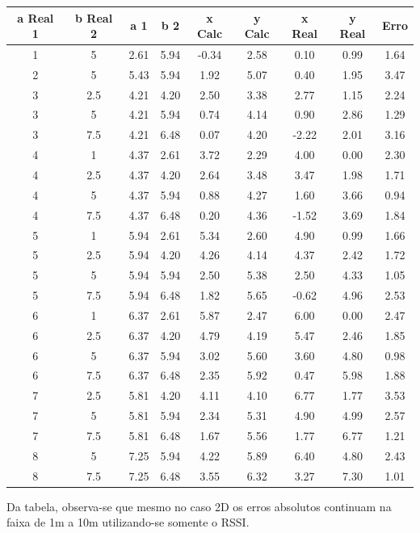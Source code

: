 \begin{center}
    \begin{tabular}{||c c c c c c c c c||} 
    \hline
    a Real 1 & b Real 2 & a 1 & b 2 & x Calc & y Calc	& x Real & y Real & Erro\\ [0.5ex] 
    \hline\hline
    1 & 5 & 2.61 & 5.94 & -0.34 & 2.58 & 0.10 & 0.99 & 1.64\\ 
    \hline
    2 & 5 & 5.43 & 5.94 & 1.92 & 5.07 & 0.40 & 1.95 & 3.47\\ 
    \hline
    3 & 2.5 & 4.21 & 4.20 & 2.50 & 3.38 & 2.77 & 1.15 & 2.24\\ 
    \hline
    3 & 5 & 4.21 & 5.94 & 0.74 & 4.14 & 0.90 & 2.86 & 1.29\\ 
    \hline
    3 & 7.5 & 4.21 & 6.48 & 0.07 & 4.20 & -2.22 & 2.01 & 3.16\\ 
    \hline
    4 & 1 & 4.37 & 2.61 & 3.72 & 2.29 & 4.00 & 0.00 & 2.30\\ 
    \hline
    4 & 2.5 & 4.37 & 4.20 & 2.64 & 3.48 & 3.47 & 1.98 & 1.71\\ 
    \hline
    4 & 5 & 4.37 & 5.94 & 0.88 & 4.27 & 1.60 & 3.66 & 0.94\\ 
    \hline
    4 & 7.5 & 4.37 & 6.48 & 0.20 & 4.36 & -1.52 & 3.69 & 1.84\\ 
    \hline
    5 & 1 & 5.94 & 2.61 & 5.34 & 2.60 & 4.90 & 0.99 & 1.66\\ 
    \hline
    5 & 2.5 & 5.94 & 4.20 & 4.26 & 4.14 & 4.37 & 2.42 & 1.72\\ 
    \hline
    5 & 5 & 5.94 & 5.94 & 2.50 & 5.38 & 2.50 & 4.33 & 1.05\\ 
    \hline
    5 & 7.5 & 5.94 & 6.48 & 1.82 & 5.65 & -0.62 & 4.96 & 2.53\\ 
    \hline
    6 & 1 & 6.37 & 2.61 & 5.87 & 2.47 & 6.00 & 0.00 & 2.47\\ 
    \hline
    6 & 2.5 & 6.37 & 4.20 & 4.79 & 4.19 & 5.47 & 2.46 & 1.85\\ 
    \hline
    6 & 5 & 6.37 & 5.94 & 3.02 & 5.60 & 3.60 & 4.80 & 0.98\\ 
    \hline
    6 & 7.5 & 6.37 & 6.48 & 2.35 & 5.92 & 0.47 & 5.98 & 1.88\\ 
    \hline
    7 & 2.5 & 5.81 & 4.20 & 4.11 & 4.10 & 6.77 & 1.77 & 3.53\\ 
    \hline
    7 & 5 & 5.81 & 5.94 & 2.34 & 5.31 & 4.90 & 4.99 & 2.57\\ 
    \hline
    7 & 7.5 & 5.81 & 6.48 & 1.67 & 5.56 & 1.77 & 6.77 & 1.21\\ 
    \hline
    8 & 5 & 7.25 & 5.94 & 4.22 & 5.89 & 6.40 & 4.80 & 2.43\\ 
    \hline
    8 & 7.5 & 7.25 & 6.48 & 3.55 & 6.32 & 3.27 & 7.30 & 1.01\\ [1ex] 
    \hline
   \end{tabular}
   \end{center}

   Da tabela, observa-se que mesmo no caso 2D os erros absolutos continuam na faixa de 1m a 10m utilizando-se somente o RSSI.